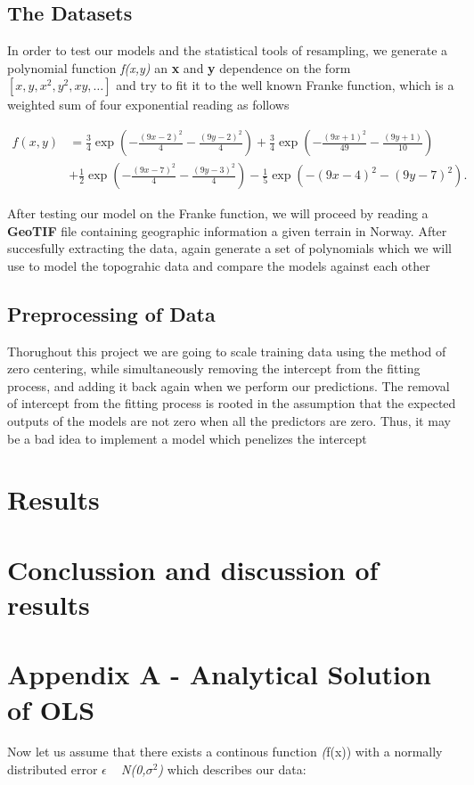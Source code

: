 \documentclass[a4paper, 10pt]{article}
\begin{document}
\subsection{The Datasets}
In order to test our models and the statistical tools of resampling, we generate a polynomial function \emph{f(x,y)} an \textbf{x} and \textbf{y} dependence on the form $[x, y, x^2, y^2, xy, \dots]$ and try to fit it to the well known Franke function, which is a weighted sum of four exponential reading as follows


$$
\begin{align*}
f(x,y) &= \frac{3}{4}\exp{\left(-\frac{(9x-2)^2}{4} - \frac{(9y-2)^2}{4}\right)}+\frac{3}{4}\exp{\left(-\frac{(9x+1)^2}{49}- \frac{(9y+1)}{10}\right)} \\
&+\frac{1}{2}\exp{\left(-\frac{(9x-7)^2}{4} - \frac{(9y-3)^2}{4}\right)} -\frac{1}{5}\exp{\left(-(9x-4)^2 - (9y-7)^2\right) }.
\end{align*}
$$

After testing our model on the Franke function, we will proceed by reading a \textbf{GeoTIF} file containing geographic information a given terrain in Norway. After succesfully extracting the data, again generate a set of polynomials which we will use to model the topograhic data and compare the models against each other

\subsection{Preprocessing of Data}
Thorughout this project we are going to scale training data using the method of zero centering, while simultaneously removing the intercept from the fitting process, and adding it back again when we perform our predictions. The removal of intercept from the fitting process is rooted in the assumption that the expected outputs of the models are not zero when all the predictors are zero. Thus, it may be a bad idea to implement a model which penelizes the intercept


\section{Results}

\section{Conclussion and discussion of results}


\section{Appendix A - Analytical Solution of OLS}
Now let us assume that there exists a continous function \emph(f(x)) with a normally distributed error $\epsilon$ ~ \emph{N(0,$\sigma^2$)} which describes our data: 
\end{document}
